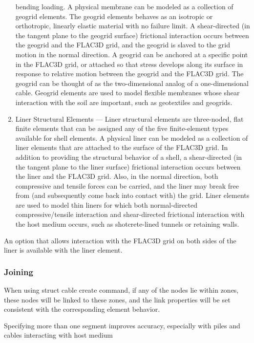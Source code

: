 \documentclass[a4paper, nobind]{templates/ociamthesis}
\begin{document}
\begin{enumerate}
  bending loading. A physical membrane can be modeled as a collection
  of geogrid elements. The geogrid elements behaves as an isotropic or
  orthotropic, linearly elastic material with no failure limit. A
  shear-directed (in the tangent plane to the geogrid surface)
  frictional interaction occurs between the geogrid and the FLAC3D
  grid, and the geogrid is slaved to the grid motion in the normal
  direction. A geogrid can be anchored at a specific point in the
  FLAC3D grid, or attached so that stress develops along its surface
  in response to relative motion between the geogrid and the FLAC3D
  grid. The geogrid can be thought of as the two-dimensional analog of
  a one-dimensional cable. Geogrid elements are used to model flexible
  membranes whose shear interaction with the soil are important, such
  as geotextiles and geogrids.
\item
  Liner Structural Elements --- Liner structural elements are
  three-noded, flat finite elements that can be assigned any of the
  five finite-element types available for shell elements. A physical
  liner can be modeled as a collection of liner elements that are
  attached to the surface of the FLAC3D grid. In addition to providing
  the structural behavior of a shell, a shear-directed (in the tangent
  plane to the liner surface) frictional interaction occurs between
  the liner and the FLAC3D grid. Also, in the normal direction, both
  compressive and tensile forces can be carried, and the liner may
  break free from (and subsequently come back into contact with) the
  grid. Liner elements are used to model thin liners for which both
  normal-directed compressive/tensile interaction and shear-directed
  frictional interaction with the host medium occurs, such as
  shotcrete-lined tunnels or retaining walls.
\end{enumerate}

An option that allows interaction with the FLAC3D grid on both sides of
the liner is available with the liner element.

\hypertarget{joining}{%
\subsubsection{Joining}\label{joining}}

When using struct cable create command, if any of the nodes lie within
zones, these nodes will be linked to these zones, and the link
properties will be set consistent with the corresponding element
behavior.

Specifying more than one segment improves accuracy, especially with
piles and cables interacting with host medium
\end{document}
